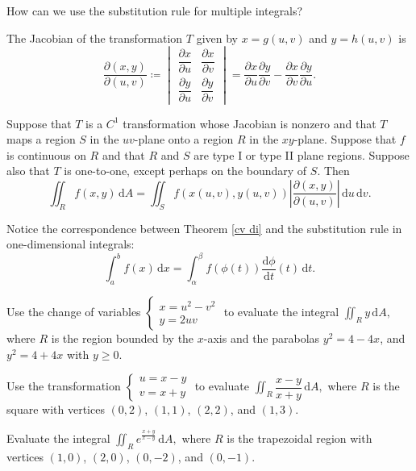 \documentclass[11pt]{article}
\theoremstyle{break}
\theoremstyle{no_label}
\newcommand{\derivative}[2]{\dfrac{\dd{#1}}{\dd{#2}}}
\newcommand{\pderivative}[2]{\dfrac{\partial {#1}}{\partial {#2}}}
\newcommand{\dd}{\text{d}}
\newcommand{\ddi}{\text{$\,$d}}
\numberwithin{equation}{theorem}
\begin{document}
\begin{question}
    How can we use the substitution rule for multiple integrals?
\end{question}

\begin{definition}
    The Jacobian of the transformation $T$ given by $x=g(u, v)$ and $y=h(u, v)$ is $$\dfrac{\partial(x, y)}{\partial(u, v)}\coloneq\begin{vmatrix}
        \pderivative{x}{u} & \pderivative{x}{v} \\ \pderivative{y}{u} & \pderivative{y}{v}
    \end{vmatrix}=\pderivative{x}{u}\pderivative{y}{v}-\pderivative{x}{v}\pderivative{y}{u}.$$
\end{definition}

\begin{theorem}\label{cv di}
    Suppose that $T$ is a $C^1$ transformation whose Jacobian is nonzero and that $T$ maps a region $S$ in the $uv$-plane onto a region $R$ in the $xy$-plane. Suppose that $f$ is continuous on $R$ and that $R$ and $S$ are type I or type II plane regions. Suppose also that $T$ is one-to-one, except perhaps on the boundary of $S$. Then $$\displaystyle\iint_R f(x, y)\ddi A=\iint_S f(x(u,v), y(u, v))\left|\dfrac{\partial(x, y)}{\partial(u, v)}\right|\ddi u\ddi v.$$
\end{theorem}

\begin{remark}
    Notice the correspondence between Theorem \ref*{cv di} and the substitution rule in one-dimensional integrals: $$\displaystyle\int_a^b f(x)\ddi x=\int_{\alpha}^{\beta}f(\phi(t))\derivative{\phi}{t}(t)\ddi t.$$
\end{remark}


\begin{example}
    Use the change of variables $\left\{\begin{array}{l}
        x=u^2-v^2\\
        y=2uv
    \end{array}\right.$ to evaluate the integral $\displaystyle\iint_R y\ddi A,$ where $R$ is the region bounded by the $x$-axis and the parabolas $y^2=4-4x$, and $y^2=4+4x$ with $y\geq 0$.
\end{example}


\begin{example}
    Use the transformation $\left\{\begin{array}{l}
        u=x-y\\
        v=x+y
    \end{array}\right.$ to evaluate $\displaystyle\iint_R\dfrac{x-y}{x+y}\ddi A,$ where $R$ is the square with vertices $(0, 2)$, $(1, 1)$, $(2, 2)$, and $(1, 3)$.
\end{example}


\begin{example}
    Evaluate the integral $\displaystyle\iint_R e^{\frac{x+y}{x-y}}\ddi A,$ where $R$ is the trapezoidal region with vertices $(1, 0)$, $(2, 0)$, $(0, -2)$, and $(0, -1)$.
\end{example}
\end{document}
